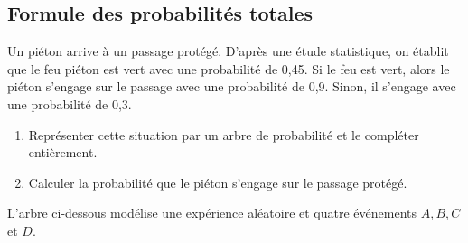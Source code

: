 \documentclass[a4paper,11pt,exos]{nsi} %
\begin{document}
\maketitle

\subsection*{Formule des probabilités totales}
\exo{}
Un piéton arrive à un passage protégé. D'après une étude statistique, on établit que le feu piéton est vert avec une probabilité de 0,45. Si le feu est vert, alors le piéton s'engage sur le passage avec une probabilité de 0,9. Sinon, il s'engage avec une probabilité de 0,3.
\begin{enumerate}
    \item Représenter cette situation par un arbre de probabilité et le compléter entièrement.
    \item Calculer la probabilité que le piéton s'engage sur le passage protégé.
\end{enumerate}


\exo{}
L'arbre ci-dessous modélise une expérience aléatoire et quatre événements $A,B, C$ et $D$.\\
\end{document}
